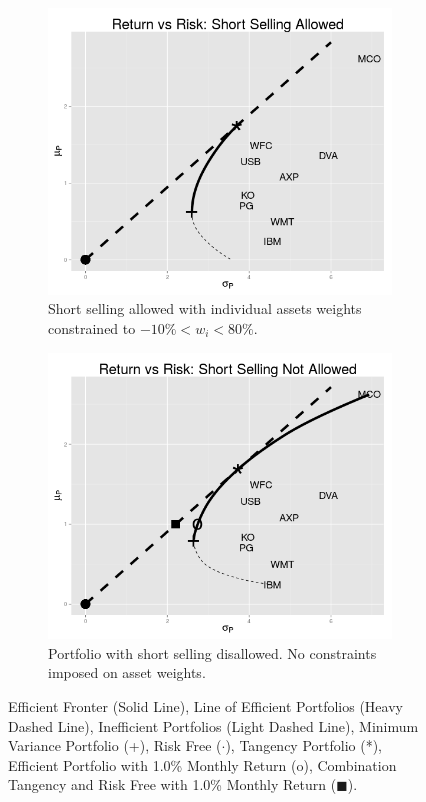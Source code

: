 \documentclass[10pt]{article_simple}
\begin{document}
\begin{figure}[H]
\centering
	\begin{subfigure}{.45\textwidth}
  	\centering
  	\includegraphics[width=.95\linewidth]{Tangency}
  	\caption{Short selling allowed with individual assets weights constrained to $-10\% < w_i < 80\%$.}
    \label{fig2:sub1}
	\end{subfigure}%
	\hspace{1em}
	\begin{subfigure}{.45\textwidth}
  	\centering
  	\includegraphics[width=.95\linewidth]{Tangency_NOS}
  	\caption{Portfolio with short selling disallowed. No constraints imposed on asset weights.}
 	\label{fig2:sub2}
	\end{subfigure}
	\caption{Efficient Fronter (Solid Line), Line of Efficient Portfolios (Heavy Dashed Line), Inefficient Portfolios (Light Dashed Line), Minimum Variance Portfolio (+), Risk Free ($\cdot$), Tangency Portfolio (*), Efficient Portfolio with 1.0\% Monthly Return (o), Combination Tangency and Risk Free with 1.0\% Monthly Return ($\blacksquare$).}
\end{figure}
\end{document}
